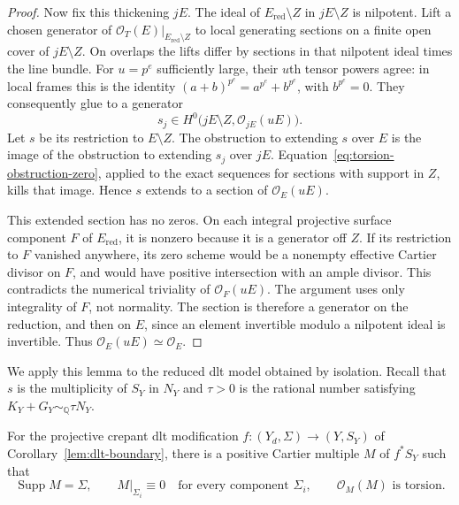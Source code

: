 \begin{proof}
Now fix this thickening $jE$.  The ideal of
$E_{\mathrm{red}}\setminus Z$ in $jE\setminus Z$ is nilpotent.  Lift a
chosen generator of $\mathcal O_T(E)|_{E_{\mathrm{red}}\setminus Z}$ to
local generating sections on a finite open cover of $jE\setminus Z$.
On overlaps the lifts differ by sections in that nilpotent ideal times
the line bundle.  For $u=p^e$ sufficiently large, their $u$th tensor
powers agree: in local frames this is the identity
$(a+b)^{p^e}=a^{p^e}+b^{p^e}$, with $b^{p^e}=0$.  They consequently
glue to a generator
\[
 s_j\in H^0\bigl(jE\setminus Z,\mathcal O_{jE}(uE)\bigr).
\]
Let $s$ be its restriction to $E\setminus Z$.  The obstruction to
extending $s$ over $E$ is the image of the obstruction to extending
$s_j$ over $jE$.  Equation~\eqref{eq:torsion-obstruction-zero}, applied
to the exact sequences for sections with support in $Z$, kills that
image.  Hence $s$ extends to a section of $\mathcal O_E(uE)$.

This extended section has no zeros.  On each integral projective
surface component $F$ of $E_{\mathrm{red}}$, it is nonzero because it is
a generator off $Z$.  If its restriction to $F$ vanished anywhere,
its zero scheme would be a nonempty effective Cartier divisor on $F$,
and would have positive intersection with an ample divisor.  This
contradicts the numerical triviality of $\mathcal O_F(uE)$.  The
argument uses only integrality of $F$, not normality.  The section is
therefore a generator on the reduction, and then on $E$, since an
element invertible modulo a nilpotent ideal is invertible.  Thus
$\mathcal O_E(uE)\simeq\mathcal O_E$.
\end{proof}

We apply this lemma to the reduced dlt model obtained by isolation.
Recall that $s$ is the multiplicity of $S_Y$ in $N_Y$ and $\tau>0$ is
the rational number satisfying $K_Y+G_Y\sim_{\mathbb Q}\tau N_Y$.

\begin{proposition}\label{prop:boundary-torsion}
For the projective crepant dlt modification
$f:(Y_d,\Sigma)\to(Y,S_Y)$ of Corollary~\ref{lem:dlt-boundary}, there is a
positive Cartier multiple $M$ of $f^*S_Y$ such that
\[
 \operatorname{Supp}M=\Sigma,
 \qquad M|_{\Sigma_i}\equiv0\quad\text{for every component }\Sigma_i,
 \qquad \mathcal O_M(M)\text{ is torsion}.
\]
\end{proposition}

